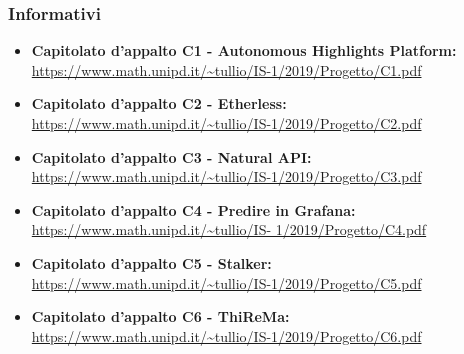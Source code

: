 \subsubsection{Informativi}

\begin{itemize}
\item \textbf {Capitolato d'appalto C1 - Autonomous Highlights Platform:}\\
\url{https://www.math.unipd.it/~tullio/IS-1/2019/Progetto/C1.pdf}
\item \textbf {Capitolato d'appalto C2 - Etherless:}\\
\url{https://www.math.unipd.it/~tullio/IS-1/2019/Progetto/C2.pdf}
\item \textbf {Capitolato d'appalto C3 - Natural API:}\\
\url{https://www.math.unipd.it/~tullio/IS-1/2019/Progetto/C3.pdf}
\item \textbf {Capitolato d'appalto C4 - Predire in Grafana:}\\
\url{https://www.math.unipd.it/~tullio/IS- 1/2019/Progetto/C4.pdf}
\item \textbf {Capitolato d'appalto C5 - Stalker:}\\
\url{https://www.math.unipd.it/~tullio/IS-1/2019/Progetto/C5.pdf}
\item \textbf {Capitolato d'appalto C6 - ThiReMa:}\\
\url{https://www.math.unipd.it/~tullio/IS-1/2019/Progetto/C6.pdf}

\end{itemize}
